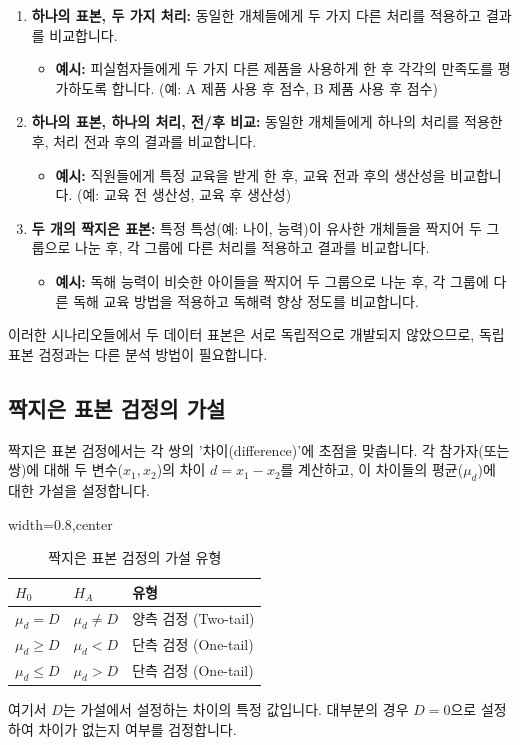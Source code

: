 \documentclass[11pt,a4paper]{book}
\theoremstyle{definition}
\begin{document}
\begin{examplebox}[title=짝지은 표본 실험의 세 가지 시나리오]
\begin{enumerate}
    \item \textbf{하나의 표본, 두 가지 처리:} 동일한 개체들에게 두 가지 다른 처리를 적용하고 결과를 비교합니다.
    \begin{itemize}
        \item \textbf{예시:} 피실험자들에게 두 가지 다른 제품을 사용하게 한 후 각각의 만족도를 평가하도록 합니다. (예: A 제품 사용 후 점수, B 제품 사용 후 점수)
    \end{itemize}
    \item \textbf{하나의 표본, 하나의 처리, 전/후 비교:} 동일한 개체들에게 하나의 처리를 적용한 후, 처리 전과 후의 결과를 비교합니다.
    \begin{itemize}
        \item \textbf{예시:} 직원들에게 특정 교육을 받게 한 후, 교육 전과 후의 생산성을 비교합니다. (예: 교육 전 생산성, 교육 후 생산성)
    \end{itemize}
    \item \textbf{두 개의 짝지은 표본:} 특정 특성(예: 나이, 능력)이 유사한 개체들을 짝지어 두 그룹으로 나눈 후, 각 그룹에 다른 처리를 적용하고 결과를 비교합니다.
    \begin{itemize}
        \item \textbf{예시:} 독해 능력이 비슷한 아이들을 짝지어 두 그룹으로 나눈 후, 각 그룹에 다른 독해 교육 방법을 적용하고 독해력 향상 정도를 비교합니다.
    \end{itemize}
\end{enumerate}
이러한 시나리오들에서 두 데이터 표본은 서로 독립적으로 개발되지 않았으므로, 독립 표본 검정과는 다른 분석 방법이 필요합니다.
\end{examplebox}

\subsection{짝지은 표본 검정의 가설}
짝지은 표본 검정에서는 각 쌍의 '차이(difference)'에 초점을 맞춥니다. 각 참가자(또는 쌍)에 대해 두 변수($x_1, x_2$)의 차이 $d = x_1 - x_2$를 계산하고, 이 차이들의 평균($\mu_d$)에 대한 가설을 설정합니다.

\begin{table}[h!]
\caption{짝지은 표본 검정의 가설 유형}
\label{tab:paired_hypotheses}
\centering
\begin{adjustbox}{width=0.8\textwidth,center}
\begin{tabular}{lll}
\toprule
\textbf{$H_0$} & \textbf{$H_A$} & \textbf{유형} \\
\midrule
$\mu_d = D$ & $\mu_d \ne D$ & 양측 검정 (Two-tail) \\
$\mu_d \ge D$ & $\mu_d < D$ & 단측 검정 (One-tail) \\
$\mu_d \le D$ & $\mu_d > D$ & 단측 검정 (One-tail) \\
\bottomrule
\end{tabular}
\end{adjustbox}
\end{table}
여기서 $D$는 가설에서 설정하는 차이의 특정 값입니다. 대부분의 경우 $D=0$으로 설정하여 차이가 없는지 여부를 검정합니다.
\end{document}
